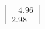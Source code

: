 \documentclass[preview]{standalone}
\begin{document}
\begin{align*}
\begin{bmatrix} -4.96 \\ 2.98 \end{bmatrix}
\end{align*}
\end{document}

